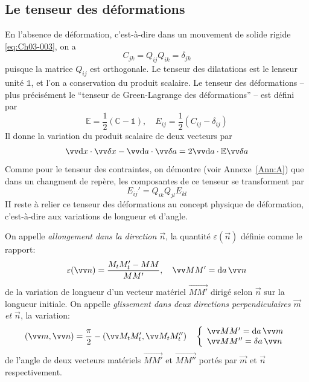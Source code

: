 \subsection{Le tenseur des déformations} \label{ssec:Ch03-1.2}
En l'absence de déformation, c'est-à-dire dans un mouvement de solide rigide \eqref{eq:Ch03-003}, on a
\begin{equation}
    C_{jk} = Q_{ij} Q_{ik} = \delta_{jk}
    \label{eq:Ch03-009}
\end{equation}
puisque la matrice $Q_{ij}$ est orthogonale.
Le tenseur des dilatations est le lenseur unité $\mathbb{1}$, et l'on a conservation du produit scalaire.
Le tenseur des déformations -- plus précisément le ``tenseur de Green-Lagrange des déformations'' -- est défini par
\begin{equation}
    \mathbb{E} = \frac{1}{2} \left( \mathbb{C} - \mathbb{1} \right), \quad E_{ij} = \frac{1}{2} \left( C_{ij} - \delta_{ij} \right)
    \label{eq:Ch03-010}
\end{equation}
Il donne la variation du produit scalaire de deux vecteurs par
\begin{equation}
    \vec{\ud x} \cdot \vec{\delta x} - \vec{\ud a} \cdot \vec{\delta a} = 2 \vec{\ud a} \cdot \mathbb{E} \vec{\delta a}
    \label{eq:Ch03-011}
\end{equation}
Comme pour le tenseur des contraintes, on démontre (voir Annexe~\ref{Ann:A}) que  dans  un  changment de repère, les composantes de  ce tenseur se transforment par
\begin{equation}
    E_{ij}' = Q_{ik} Q_{jl} E_{kl}
    \label{eq:Ch03-012}
\end{equation}
II reste à relier ce tenseur des déformations au concept physique de déformation, c'est-à-dire aux variations de longueur et d'angle.
\begin{deff}
    On appelle \emph{allongement dans la direction $\vec{n}$}, la quantité $\varepsilon \left( \vec{n} \right)$ définie comme le rapport:
    \begin{equation}
        \varepsilon(\vec{n}) = \frac{M_tM_t' -MM}{MM'}, \quad \vec{MM'} = \ud a\, \vec{n}
        \label{eq:Ch03-013}
    \end{equation}
    de la variation de longueur d'un vecteur matériel $\vec{MM'}$ dirigé selon $\vec{n}$ sur la longueur initiale.
    On appelle \emph{glissement dans deux directions perpendiculaires $\vec{m}$ et $\vec{n}$}, la variation:
    \begin{equation}
        \left( \vec{m}, \vec{n} \right) = \frac{\pi}{2} - \left( \vec{M_t M_t'}, \vec{M_tM_t''} \right) 
        \quad \left\{
        \begin{array}{l}
            \vec{MM'} = \ud a\, \vec{m} \\
            \vec{MM''} = \delta a\, \vec{n}
        \end{array}
        \right.
        \label{eq:Ch03-014}
    \end{equation}
    de l'angle de deux vecteurs matériels $\vec{MM'}$ et $\vec{MM''}$ portés par $\vec{m}$ et $\vec{n}$ respectivement.
\end{deff}
